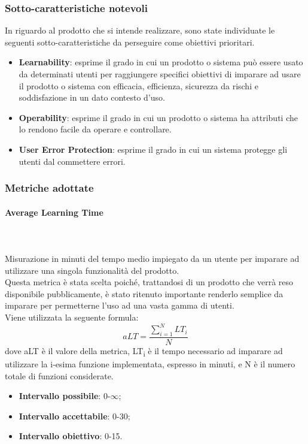 \subsubsection{Sotto-caratteristiche notevoli}
In riguardo al prodotto che si intende realizzare, sono state individuate le seguenti sotto-caratteristiche da perseguire come obiettivi prioritari.
\begin{itemize}
	\item{\textbf{Learnability}}: esprime il grado in cui un prodotto o sistema può essere usato da determinati utenti per raggiungere specifici obiettivi di imparare ad usare il prodotto o sistema con efficacia, efficienza, sicurezza da rischi e soddisfazione in un dato contesto d'uso.
	\item{\textbf{Operability}}: esprime il grado in cui un prodotto o sistema ha attributi che lo rendono facile da operare e controllare.
	\item{\textbf{User Error Protection}}: esprime il grado in cui un sistema protegge gli utenti dal commettere errori.
\end{itemize}
\subsubsection{Metriche adottate}
\paragraph{Average Learning Time}  ~\\ ~\\
Misurazione in minuti del tempo medio impiegato da un utente per imparare ad utilizzare una singola funzionalità del prodotto.
\\Questa metrica è stata scelta poiché, trattandosi di un prodotto che verrà reso disponibile pubblicamente, è stato ritenuto importante renderlo semplice da imparare per permetterne l'uso ad una vasta gamma di utenti.
\\Viene utilizzata la seguente formula:
$$aLT=\frac{\sum\limits_{i=1}^N{LT_i}}{N}$$
dove aLT è il valore della metrica, LT\textsubscript{i} è il tempo necessario ad imparare ad utilizzare la i-esima funzione implementata, espresso in minuti, e N è il numero totale di funzioni considerate.
\begin{itemize}
	\item{\textbf{Intervallo possibile}: 0-$\infty$;}
	\item{\textbf{Intervallo accettabile}: 0-30;}
	\item{\textbf{Intervallo obiettivo}: 0-15.}
\end{itemize}

